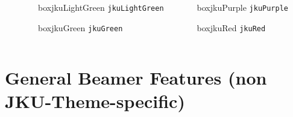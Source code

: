 \documentclass[aspectratio=169]{beamer}
\begin{document}
\begin{frame}
\begin{columns}[t]
\begin{column}{0.18\textwidth}
\end{column}

\begin{column}{0.18\textwidth}
\begin{beamercolorbox}[wd=0.85\linewidth,ht=5ex,dp=3ex]{boxjkuLightGreen}
\centering
	\texttt{jkuLightGreen}\\
\end{beamercolorbox}

\vspace{2em}

\begin{beamercolorbox}[wd=0.85\linewidth,ht=5ex,dp=3ex]{boxjkuGreen}
\centering
	\texttt{jkuGreen}\\
\end{beamercolorbox}

\end{column}


\begin{column}{0.18\textwidth}
\begin{beamercolorbox}[wd=0.85\linewidth,ht=5ex,dp=3ex]{boxjkuPurple}
\centering
	\texttt{jkuPurple}\\
\end{beamercolorbox}

\vspace{2em}

\begin{beamercolorbox}[wd=0.85\linewidth,ht=5ex,dp=3ex]{boxjkuRed}
\centering
	\texttt{jkuRed}\\
\end{beamercolorbox}
\end{column}
\end{columns}
\end{frame}


\section{General Beamer Features (non JKU-Theme-specific)}
\end{document}
